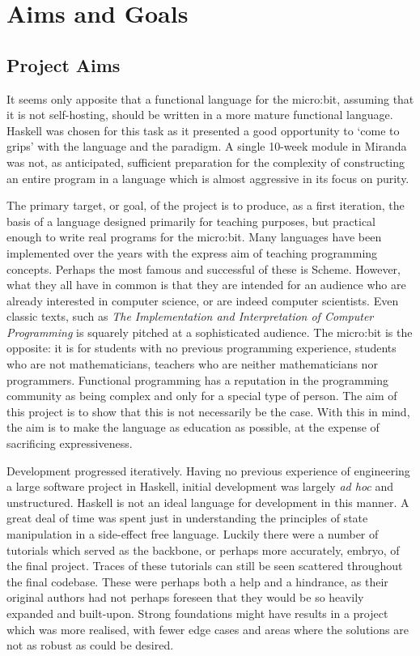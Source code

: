 \documentclass[12pt, a4paper]{report}
\begin{document}
\section{Aims and Goals}
\subsection{Project Aims}
It seems only apposite that a functional language for the micro:bit, assuming that it is not
self-hosting, should be written in a more mature functional language. Haskell was chosen for this
task as it presented a good opportunity to `come to grips' with the language and the paradigm. A
single 10-week module in Miranda was not, as anticipated, sufficient preparation for the complexity
of constructing an entire program in a language which is almost aggressive in its focus on purity. 

The primary target, or goal, of the project is to produce, as a first iteration, the basis of a
language designed primarily for teaching purposes, but practical enough to write real programs for
the micro:bit. Many languages have been implemented over the years with the express aim of teaching
programming concepts. Perhaps the most famous and successful of these is Scheme. However, what they
all have in common is that they are intended for an audience who are already interested in computer
science, or are indeed computer scientists. Even classic texts, such as \textit{The Implementation
and Interpretation of Computer Programming} is squarely pitched at a sophisticated audience.
The micro:bit is the opposite: it is for students with no previous programming experience,
students who are not mathematicians, teachers who are neither mathematicians nor programmers.
Functional programming has a reputation in the programming community as being complex and only for a
special type of person. The aim of this project is to show that this is not necessarily be the case.
With this in mind, the aim is to make the language as education as possible, at the expense of
sacrificing expressiveness. 


Development progressed iteratively. Having no previous experience of engineering a large software
project in Haskell, initial development was largely \textit{ad hoc} and unstructured. Haskell is not
an ideal language for development in this manner. A great deal of time was spent just in understanding 
the principles of state manipulation in a side-effect free language. Luckily there were a number of 
tutorials which served as the backbone, or perhaps more accurately, embryo, of the final project. 
Traces of these tutorials can still be seen scattered throughout the final codebase. These were 
perhaps both a help and a hindrance, as their original authors had not perhaps foreseen that 
they would be so heavily expanded and built-upon. Strong foundations might have results in a project 
which was more realised, with fewer edge cases and areas where the solutions are not as robust as could be desired. \\
\end{document}
